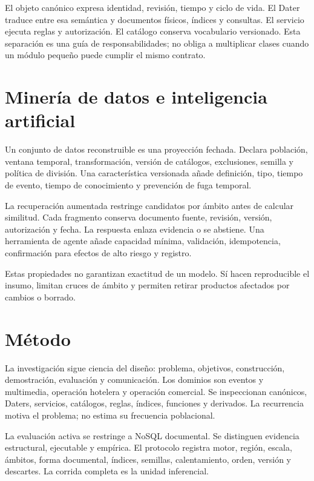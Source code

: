 \documentclass[12pt]{article}
\begin{document}
El objeto canónico expresa identidad, revisión, tiempo y ciclo de vida. El Dater traduce
entre esa semántica y documentos físicos, índices y consultas. El servicio ejecuta
reglas y autorización. El catálogo conserva vocabulario versionado. Esta separación es
una guía de responsabilidades; no obliga a multiplicar clases cuando un módulo pequeño
puede cumplir el mismo contrato.

\section{Minería de datos e inteligencia artificial}

Un conjunto de datos reconstruible es una proyección fechada. Declara población,
ventana temporal, transformación, versión de catálogos, exclusiones, semilla y política
de división. Una característica versionada añade definición, tipo, tiempo de evento,
tiempo de conocimiento y prevención de fuga temporal.

La recuperación aumentada restringe candidatos por ámbito antes de calcular similitud.
Cada fragmento conserva documento fuente, revisión, versión, autorización y fecha. La
respuesta enlaza evidencia o se abstiene. Una herramienta de agente añade capacidad
mínima, validación, idempotencia, confirmación para efectos de alto riesgo y registro.

Estas propiedades no garantizan exactitud de un modelo. Sí hacen reproducible el insumo,
limitan cruces de ámbito y permiten retirar productos afectados por cambios o borrado.

\section{Método}

La investigación sigue ciencia del diseño: problema, objetivos, construcción,
demostración, evaluación y comunicación. \COBRIAPerfilesCientificos
Los dominios son eventos y multimedia, operación hotelera y operación comercial.
Se inspeccionan canónicos, Daters, servicios, catálogos, reglas, índices, funciones y
derivados. La recurrencia motiva el problema; no estima su frecuencia poblacional.

La evaluación activa se restringe a NoSQL documental. Se distinguen evidencia
estructural, ejecutable y empírica. El protocolo registra motor, región, escala, ámbitos,
forma documental, índices, semillas, calentamiento, orden, versión y descartes. La
corrida completa es la unidad inferencial.
\end{document}
